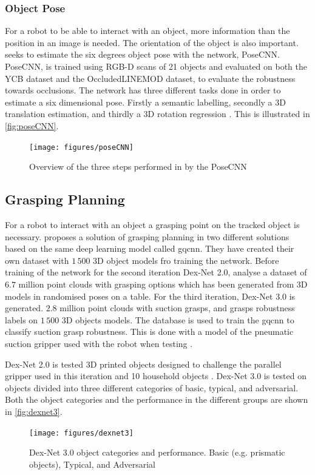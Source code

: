 \subsubsection{Object Pose}
For a robot to be able to interact with an object, more information than the position in an image is needed. The orientation of the object is also important. \cite{Xiang2017} seeks to estimate the six degrees object pose with the network, PoseCNN. PoseCNN, is trained using RGB-D scans of 21 objects and evaluated on both the YCB dataset and the OccludedLINEMOD dataset, to evaluate the robustness towards occlusions. The network has three different tasks done in order to estimate a six dimensional pose. Firstly a semantic labelling, secondly a 3D translation estimation, and thirdly a 3D rotation regression \citep{Xiang2017}. This is illustrated in \autoref{fig:poseCNN}.

\begin{figure}[H]
	\centering
	\texttt{[image: figures/poseCNN]}
	\caption{Overview of the three steps performed in by the PoseCNN \citep{Xiang2017}}
	\label{fig:poseCNN}
\end{figure}

\subsection{Grasping Planning}
For a robot to interact with an object a grasping point on the tracked object is necessary. \cite{Mahler2017} proposes a solution of grasping planning in two different solutions based on the same deep learning model called \gls{gqcnn}. They have created their own dataset with $1\,500$ 3D object models fro training the network. Before training of the network for the second iteration Dex-Net 2.0, \cite{Mahler2017} analyse a dataset of $6.7$ million point clouds with grasping options which has been generated from 3D models in randomised poses on a table. For the third iteration, Dex-Net 3.0 is generated. $2.8$ million point clouds with suction grasps, and grasps robustness labels on $1\,500$ 3D objects models. The database is used to train the \gls{gqcnn} to classify suction grasp robustness. This is done with a model of the pneumatic suction gripper used with the robot when testing \citep{Dexnet3}. 

Dex-Net 2.0 is tested 3D printed objects designed to challenge the parallel gripper used in this iteration and 10 household objects \citep{Mahler2017}. Dex-Net 3.0 is tested on objects divided into three different categories of basic, typical, and adversarial. Both the object categories and the performance in the different groups are shown in \autoref{fig:dexnet3}.

\begin{figure}[H]
	\centering
	\texttt{[image: figures/dexnet3]}
	\caption{Dex-Net 3.0 object categories and performance. Basic (e.g. prismatic objects), Typical, and Adversarial \citep{Dexnet3}}
	\label{fig:dexnet3}
\end{figure}